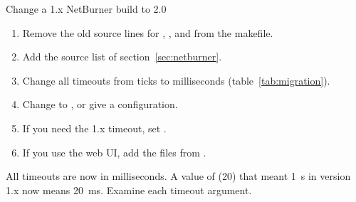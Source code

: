 \begin{procedure}{Change a 1.x NetBurner build to 2.0}
\begin{enumerate}
  \item Remove the old source lines for ,
        , and  from the makefile.
  \item Add the source list of section~\ref{sec:netburner}.
  \item Change all timeouts from ticks to milliseconds (table~\ref{tab:migration}).
  \item Change  to , or
        give a configuration.
  \item If you need the 1.x timeout, set .
  \item If you use the web UI, add the files from
        .
\end{enumerate}
\end{procedure}

\begin{caution}
All timeouts are now in milliseconds. A value of  (20)
that meant 1~s in version 1.x now means 20~ms. Examine each timeout argument.
\end{caution}

